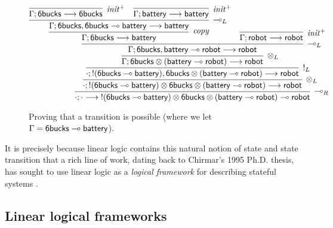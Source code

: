 \begin{figure}
\[
\infer[{\lolli}_R]
{\seq{\cdot}{\cdot}{{!}({\sf 6bucks} \lolli {\sf battery}) \otimes
                    {\sf 6bucks} \otimes 
                    ({\sf battery} \lolli {\sf robot}) \lolli {\sf robot}}}
{\infer[{\otimes}_L]
{\seq{\cdot}{{!}({\sf 6bucks} \lolli {\sf battery}) \otimes
                    {\sf 6bucks} \otimes 
                    ({\sf battery} \lolli {\sf robot})}{{\sf robot}}}
{\infer[{!}_L]
{\seq{\cdot}{{!}({\sf 6bucks} \lolli {\sf battery}),
                    {\sf 6bucks} \otimes 
                    ({\sf battery} \lolli {\sf robot})}{{\sf robot}}}
{\infer[{\otimes}_L]
{\seq{\Gamma}{{\sf 6bucks} \otimes 
                    ({\sf battery} \lolli {\sf robot})}{{\sf robot}}}
{\infer[{\lolli}_L]
{\seq{\Gamma}{{\sf 6bucks}, {\sf battery} \lolli {\sf robot}}{{\sf robot}}}
{\infer[{\it copy}]
 {\seq{\Gamma}{{\sf 6bucks}}{{\sf battery}}}
 {\infer[{\lolli}_L] 
  {\seq{\Gamma}{{\sf 6bucks}, {\sf 6bucks} \lolli {\sf battery}}{{\sf battery}}}
  {\infer[{\it init}^+]
   {\seq{\Gamma}{{\sf 6bucks}}{{\sf 6bucks}}}
   {}
   &
   \infer[{\it init}^+]
   {\seq{\Gamma}{{\sf battery}}{{\sf battery}}}
   {}}}
 &
 \infer[{\it init}^+]
 {\seq{\Gamma}{{\sf robot}}{{\sf robot}}}
 {}}}}}}
\] 
\caption{Proving that a transition is possible 
(where we let $\Gamma = {\sf 6bucks} \multimap {\sf battery}$).}
\label{fig:unfocused-robot}
\end{figure}

It is precisely because linear logic contains this natural notion of
state and state transition that a rich line of work, dating back to
Chirmar's 1995 Ph.D. thesis, has sought to use linear logic as a {\it
  logical framework} for describing stateful systems
\cite{chirimar95proof,cervesato02linear,
  cervesato02concurrent,pfenning04substructural,miller09formalizing,
  pfenning09substructural,cervesato09relating}.

\subsection*{Linear logical frameworks}

